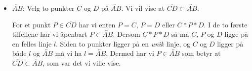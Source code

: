 \begin{oppgave}[3.3.2]
\begin{itemize}
    \item $\overleftrightarrow{AB}$: Velg to punkter $C$ og $D$ på $\overleftrightarrow{AB}$. Vi vil
    vise at $\overline{CD}\subset \overleftrightarrow{AB}$. 

    For et punkt $P\in \overline{CD}$ har vi enten $P=C$, $P=D$ eller $C\ast P\ast D$. I de to 
    første tilfellene har vi åpenbart $P\in \overleftrightarrow{AB}$. Dersom $C\ast P\ast D$ så må 
    $C$, $P$ og $D$ ligge på en felles linje $l$. Siden to punkter ligger på en \emph{unik} linje, 
    og $C$ og $D$ ligger på både $l$ og $\overleftrightarrow{AB}$ må vi ha $l=\overleftrightarrow{AB}$.
    Dermed har vi $P\in \overleftrightarrow{AB}$ som betyr at 
    $\overline{CD}\subset \overleftrightarrow{AB}$, som var det vi ville vise. 

  \end{itemize}
\end{oppgave}

